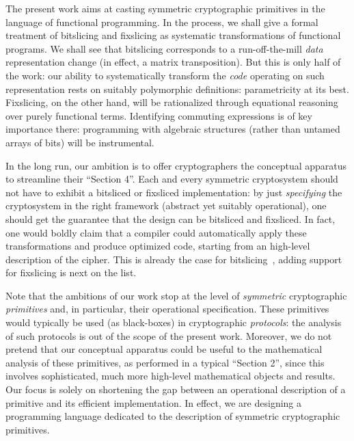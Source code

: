 \documentclass[draft,english]{jflart}
\begin{document}
The present work aims at casting symmetric cryptographic primitives in
the language of functional programming. In the process, we shall give
a formal treatment of bitslicing and fixslicing as systematic
transformations of functional programs. We shall see that bitslicing
corresponds to a run-off-the-mill \emph{data} representation change
(in effect, a matrix transposition). But this is only half of the
work: our ability to systematically transform the \emph{code}
operating on such representation rests on suitably polymorphic
definitions: parametricity at its best. Fixslicing, on the other hand,
will be rationalized through equational reasoning over purely
functional terms. Identifying commuting expressions is of key
importance there: programming with algebraic structures (rather than
untamed arrays of bits) will be instrumental.

In the long run, our ambition is to offer cryptographers the
conceptual apparatus to streamline their ``Section 4''.
Each and every symmetric cryptosystem should not have to exhibit a
bitsliced or fixsliced implementation: by just \emph{specifying} the
cryptosystem in the right framework (abstract yet suitably
operational), one should get the guarantee that the design can be
bitsliced and fixsliced. In fact, one would boldly claim that a
compiler could automatically apply these transformations and produce
optimized code, starting from an high-level description of the cipher.
This is already the case for bitslicing~\citep{mercadier:PhD}, adding support
for fixslicing is next on the list.

Note that the ambitions of our work stop at the level of
\emph{symmetric} cryptographic \emph{primitives} and, in particular,
their operational specification. These primitives would typically be
used (as black-boxes) in cryptographic \emph{protocols}: the analysis
of such protocols is out of the scope of the present work. Moreover,
we do not pretend that our conceptual apparatus could be useful to the
mathematical analysis of these primitives, as performed in a typical
``Section 2'', since this involves sophisticated, much more high-level
mathematical objects and results. Our focus is solely on shortening
the gap between an operational description of a primitive and its
efficient implementation. In effect, we are designing a programming
language dedicated to the description of symmetric cryptographic
primitives.

\end{document}

